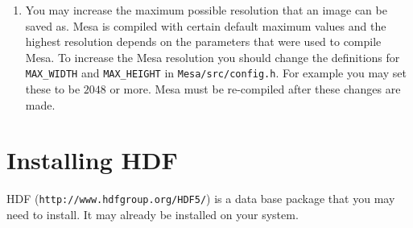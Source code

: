 \documentclass{article}
\begin{document}
\begin{enumerate}
   \item You may increase the maximum possible resolution that an image can be saved as.
         Mesa is compiled with certain default maximum values
      and the highest resolution depends on the parameters
      that were used to compile Mesa. To increase the Mesa resolution you should
      change the definitions for {\tt MAX\_WIDTH} and {\tt MAX\_HEIGHT} 
      in {\tt Mesa/src/config.h}. For example you may set these to be $2048$ or more.
      Mesa must be re-compiled after these changes are made.
 \end{enumerate}

\clearpage
\section{Installing HDF}

HDF ({\tt http://www.hdfgroup.org/HDF5/}) is a data base package that you may need to install. It may
already be installed on your system.

\end{document}
